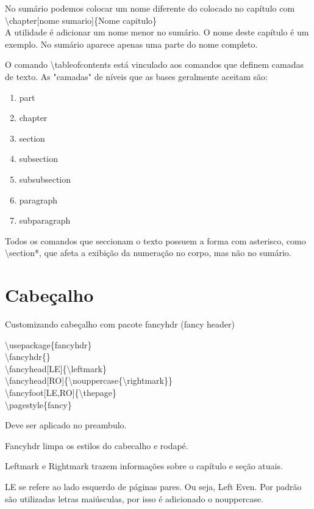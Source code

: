 No sumário podemos colocar um nome diferente do colocado no capítulo com \\
\textbackslash chapter[nome sumario]\{Nome capitulo\} \\
A utilidade é adicionar um nome menor no sumário.
O nome deste capítulo é um exemplo.
No sumário aparece apenas uma parte do nome completo.

O comando \textbackslash tableofcontents está vinculado aos comandos que definem camadas de texto.
As "camadas" de níveis que as bases geralmente aceitam são:
\begin{multicols}{2}
\begin{enumerate}
    \item part
    \item chapter
    \item section
    \item subsection
    \item subsubsection
    \item paragraph
    \item subparagraph
\end{enumerate}
\end{multicols}

Todos os comandos que seccionam o texto possuem a forma
com asterisco, como \textbackslash section*, que afeta a exibição
da numeração no corpo, mas não no sumário.

\section{Cabeçalho}
Customizando cabeçalho com pacote fancyhdr (fancy header)

\noindent \textbackslash usepackage\{fancyhdr\}\\
\textbackslash fancyhdr\{\} \\
\textbackslash fancyhead[LE]\{\textbackslash leftmark\} \\
\textbackslash fancyhead[RO]\{\textbackslash nouppercase\{\textbackslash rightmark\}\} \\
\textbackslash fancyfoot[LE,RO]\{\textbackslash thepage\} \\
\textbackslash pagestyle\{fancy\} 

Deve ser aplicado no preambulo.

Fancyhdr limpa os estilos do cabecalho e rodapé.

Leftmark e Rightmark trazem informações sobre o capítulo e seção atuais.

LE se refere ao lado esquerdo de páginas pares. Ou seja, Left Even.
Por padrão são utilizadas letras maiúsculas, por isso
é adicionado o nouppercase.

